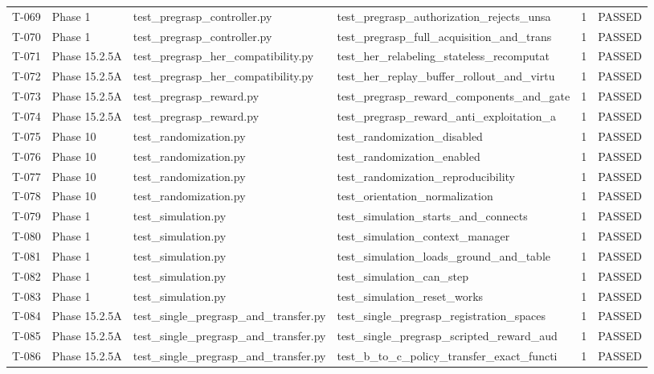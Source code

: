 \documentclass[11pt,a4paper,oneside]{book}
\begin{document}
\begin{longtable}{l l l l l l}
T-069 & Phase 1 & test\_pregrasp\_controller.py & test\_pregrasp\_authorization\_rejects\_unsa & 1 & PASSED \\
T-070 & Phase 1 & test\_pregrasp\_controller.py & test\_pregrasp\_full\_acquisition\_and\_trans & 1 & PASSED \\
T-071 & Phase 15.2.5A & test\_pregrasp\_her\_compatibility.py & test\_her\_relabeling\_stateless\_recomputat & 1 & PASSED \\
T-072 & Phase 15.2.5A & test\_pregrasp\_her\_compatibility.py & test\_her\_replay\_buffer\_rollout\_and\_virtu & 1 & PASSED \\
T-073 & Phase 15.2.5A & test\_pregrasp\_reward.py & test\_pregrasp\_reward\_components\_and\_gate & 1 & PASSED \\
T-074 & Phase 15.2.5A & test\_pregrasp\_reward.py & test\_pregrasp\_reward\_anti\_exploitation\_a & 1 & PASSED \\
T-075 & Phase 10 & test\_randomization.py & test\_randomization\_disabled & 1 & PASSED \\
T-076 & Phase 10 & test\_randomization.py & test\_randomization\_enabled & 1 & PASSED \\
T-077 & Phase 10 & test\_randomization.py & test\_randomization\_reproducibility & 1 & PASSED \\
T-078 & Phase 10 & test\_randomization.py & test\_orientation\_normalization & 1 & PASSED \\
T-079 & Phase 1 & test\_simulation.py & test\_simulation\_starts\_and\_connects & 1 & PASSED \\
T-080 & Phase 1 & test\_simulation.py & test\_simulation\_context\_manager & 1 & PASSED \\
T-081 & Phase 1 & test\_simulation.py & test\_simulation\_loads\_ground\_and\_table & 1 & PASSED \\
T-082 & Phase 1 & test\_simulation.py & test\_simulation\_can\_step & 1 & PASSED \\
T-083 & Phase 1 & test\_simulation.py & test\_simulation\_reset\_works & 1 & PASSED \\
T-084 & Phase 15.2.5A & test\_single\_pregrasp\_and\_transfer.py & test\_single\_pregrasp\_registration\_spaces & 1 & PASSED \\
T-085 & Phase 15.2.5A & test\_single\_pregrasp\_and\_transfer.py & test\_single\_pregrasp\_scripted\_reward\_aud & 1 & PASSED \\
T-086 & Phase 15.2.5A & test\_single\_pregrasp\_and\_transfer.py & test\_b\_to\_c\_policy\_transfer\_exact\_functi & 1 & PASSED \\

\end{longtable}
\end{document}
